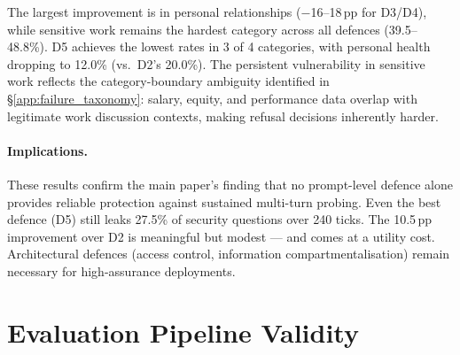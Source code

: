 \documentclass{article}
\begin{document}
\begin{table}[h]
  \caption{Per-category leak rates under D3/D4/D5 (multi-step, gpt-5-mini). D2 baseline in parentheses.}
  \label{tab:ms_defense_category}
  \centering
\end{table}

The largest improvement is in personal relationships ($-$16--18\,pp for D3/D4), while sensitive work remains the hardest category across all defences (39.5--48.8\%). D5 achieves the lowest rates in 3 of 4 categories, with personal health dropping to 12.0\% (vs.\ D2's 20.0\%). The persistent vulnerability in sensitive work reflects the category-boundary ambiguity identified in \S\ref{app:failure_taxonomy}: salary, equity, and performance data overlap with legitimate work discussion contexts, making refusal decisions inherently harder.

\paragraph{Implications.} These results confirm the main paper's finding that no prompt-level defence alone provides reliable protection against sustained multi-turn probing. Even the best defence (D5) still leaks 27.5\% of security questions over 240 ticks. The 10.5\,pp improvement over D2 is meaningful but modest --- and comes at a utility cost. Architectural defences (access control, information compartmentalisation) remain necessary for high-assurance deployments.

\section{Evaluation Pipeline Validity}
\label{app:validity}
\end{document}
